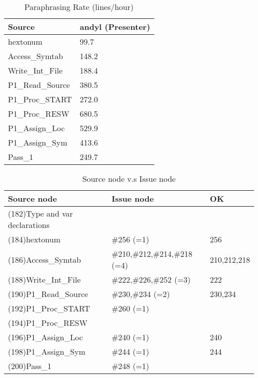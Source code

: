 \begin{table}[hb]
\begin{center}
\begin{tabular}{|l|l|}
\hline
Source & andyl (Presenter)\\
\hline
hextonum & 99.7\\
Access\_Symtab & 148.2\\
Write\_Int\_File & 188.4\\
P1\_Read\_Source & 380.5\\
P1\_Proc\_START & 272.0\\
P1\_Proc\_RESW & 680.5\\
P1\_Assign\_Loc & 529.9\\
P1\_Assign\_Sym & 413.6\\
Pass\_1 & 249.7\\
\hline
\end{tabular}
\end{center}
\caption{Paraphrasing Rate (lines/hour)}
\end{table}


\begin{table}[hb]
\begin{center}
\begin{tabular}{|l|l|l|}
\hline
Source node & Issue node & OK \\
\hline
(182)Type and var declarations &  & \\
(184)hextonum & \#256 (=1) & 256\\
(186)Access\_Symtab & \#210,\#212,\#214,\#218 (=4) & 210,212,218\\
(188)Write\_Int\_File & \#222,\#226,\#252 (=3) & 222\\
(190)P1\_Read\_Source & \#230,\#234 (=2) & 230,234\\
(192)P1\_Proc\_START & \#260 (=1) & \\
(194)P1\_Proc\_RESW &  & \\
(196)P1\_Assign\_Loc & \#240 (=1) & 240\\
(198)P1\_Assign\_Sym & \#244 (=1) & 244\\
(200)Pass\_1 & \#248 (=1) & \\
\hline
\end{tabular}
\caption{Source node v.s Issue node}
\end{center}
\end{table}

